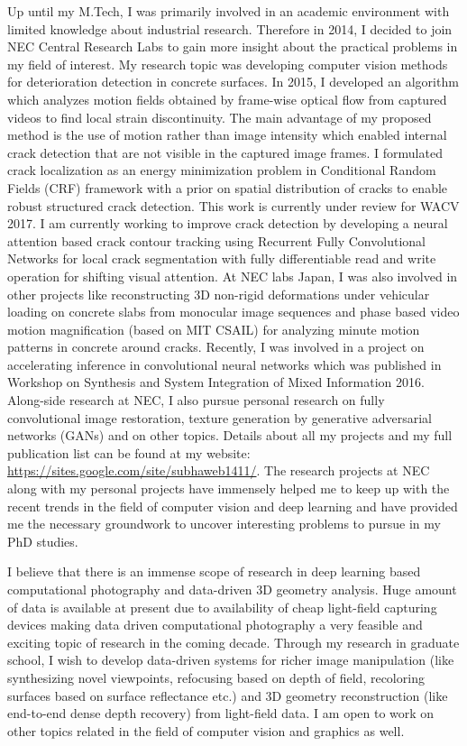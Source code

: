 \documentclass{article}
\begin{document}
	Up until my M.Tech, I was primarily involved in an academic environment with limited knowledge about industrial research. Therefore in 2014, I decided to join NEC Central Research Labs to gain more insight about the practical problems in my field of interest. My research topic was developing computer vision methods for deterioration detection in concrete surfaces. In 2015, I developed an algorithm which analyzes motion fields obtained by frame-wise optical flow from captured videos to find local strain discontinuity. The main advantage of my proposed method is the use of motion rather than image intensity which enabled internal crack detection that are not visible in the captured image frames. I formulated crack localization as an energy minimization problem in Conditional Random Fields (CRF) framework with a prior on spatial distribution of cracks to enable robust structured crack detection. This work is currently under review for WACV 2017. I am currently working to improve crack detection by developing a neural attention based crack contour tracking using Recurrent Fully Convolutional Networks for local crack segmentation with fully differentiable read and write operation for shifting visual attention. At NEC labs Japan, I was also involved in other projects like reconstructing 3D non-rigid deformations under vehicular loading on concrete slabs from monocular image sequences and phase based video motion magnification (based on MIT CSAIL) for analyzing minute motion patterns in concrete around cracks. Recently, I was involved in a project on accelerating inference in convolutional neural networks which was published in Workshop on Synthesis and System Integration of Mixed Information 2016. Along-side research at NEC, I also pursue personal research on fully convolutional image restoration, texture generation by generative adversarial networks (GANs) and on other topics. Details about all my projects and my full publication list can be found at my website: \url{https://sites.google.com/site/subhaweb1411/}. The research projects at NEC along with my personal projects have immensely helped me to keep up with the recent trends in the field of computer vision and deep learning and have provided me the necessary groundwork to uncover interesting problems to pursue in my PhD studies. 
	
	\vspace{0.2cm}
	
	I believe that there is an immense scope of research in deep learning based computational photography and data-driven 3D geometry analysis. Huge amount of data is available at present due to availability of cheap light-field capturing devices making data driven computational photography a very feasible and exciting topic of research in the coming decade. Through my research in graduate school, I wish to develop data-driven systems for richer image manipulation (like synthesizing novel viewpoints, refocusing based on depth of field, recoloring surfaces based on surface reflectance etc.) and 3D geometry reconstruction (like end-to-end dense depth recovery) from light-field data. I am open to work on other topics related in the field of computer vision and graphics as well.
	
\end{document}
